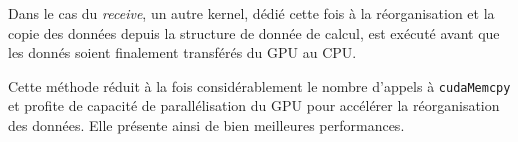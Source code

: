 Dans le cas du \textit{receive}, un autre kernel, dédié cette fois à la réorganisation et la copie des données depuis la structure de donnée de calcul, est exécuté avant que les donnés soient finalement transférés du \acs{GPU} au \acs{CPU}.

Cette méthode réduit à la fois considérablement le nombre d'appels à \texttt{cudaMemcpy} et profite de capacité de parallélisation du \acs{GPU} pour accélérer la réorganisation des données. Elle présente ainsi de bien meilleures performances.

\begin{figure}[h]
	\centering
\end{figure}
